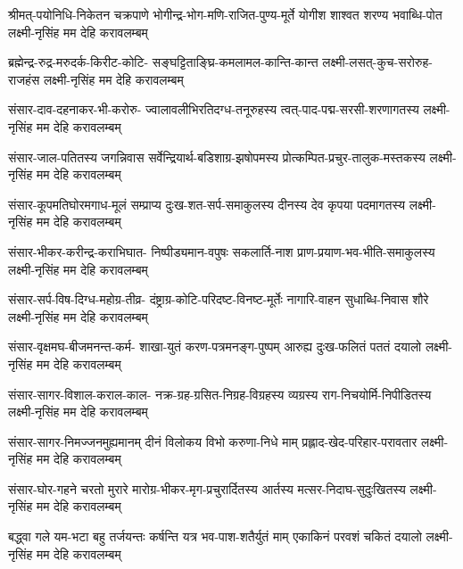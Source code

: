 


\fourlineindentedshloka
{श्रीमत्-पयोनिधि-निकेतन चक्रपाणे}
{भोगीन्द्र-भोग-मणि-राजित-पुण्य-मूर्ते}
{योगीश शाश्वत शरण्य भवाब्धि-पोत}
{लक्ष्मी-नृसिंह मम देहि करावलम्बम्}

\fourlineindentedshloka
{ब्रह्मेन्द्र-रुद्र-मरुदर्क-किरीट-कोटि-}
{सङ्घट्टिताङ्घ्रि-कमलामल-कान्ति-कान्त}
{लक्ष्मी-लसत्-कुच-सरोरुह-राजहंस}
{लक्ष्मी-नृसिंह मम देहि करावलम्बम्}

\fourlineindentedshloka
{संसार-दाव-दहनाकर-भी-करोरु-}
{ज्वालावलीभिरतिदग्ध-तनूरुहस्य}
{त्वत्-पाद-पद्म-सरसी-शरणागतस्य}
{लक्ष्मी-नृसिंह मम देहि करावलम्बम्}

\fourlineindentedshloka
{संसार-जाल-पतितस्य जगन्निवास}
{सर्वेन्द्रियार्थ-बडिशाग्र-झषोपमस्य}
{प्रोत्कम्पित-प्रचुर-तालुक-मस्तकस्य}
{लक्ष्मी-नृसिंह मम देहि करावलम्बम्}

\fourlineindentedshloka
{संसार-कूपमतिघोरमगाध-मूलं}
{सम्प्राप्य दुःख-शत-सर्प-समाकुलस्य}
{दीनस्य देव कृपया पदमागतस्य}
{लक्ष्मी-नृसिंह मम देहि करावलम्बम्}

\fourlineindentedshloka
{संसार-भीकर-करीन्द्र-कराभिघात-}
{निष्पीड्यमान-वपुषः सकलार्ति-नाश}
{प्राण-प्रयाण-भव-भीति-समाकुलस्य}
{लक्ष्मी-नृसिंह मम देहि करावलम्बम्}

\fourlineindentedshloka
{संसार-सर्प-विष-दिग्ध-महोग्र-तीव्र-}
{दंष्ट्राग्र-कोटि-परिदष्ट-विनष्ट-मूर्तेः}
{नागारि-वाहन सुधाब्धि-निवास शौरे}
{लक्ष्मी-नृसिंह मम देहि करावलम्बम्}

\fourlineindentedshloka
{संसार-वृक्षमघ-बीजमनन्त-कर्म-}
{शाखा-युतं करण-पत्रमनङ्ग-पुष्पम्}
{आरुह्य दुःख-फलितं पततं दयालो}
{लक्ष्मी-नृसिंह मम देहि करावलम्बम्}

\fourlineindentedshloka
{संसार-सागर-विशाल-कराल-काल-}
{नक्र-ग्रह-ग्रसित-निग्रह-विग्रहस्य}
{व्यग्रस्य राग-निचयोर्मि-निपीडितस्य}
{लक्ष्मी-नृसिंह मम देहि करावलम्बम्}

\fourlineindentedshloka
{संसार-सागर-निमज्जनमुह्यमानम्}
{दीनं विलोकय विभो करुणा-निधे माम्}
{प्रह्लाद-खेद-परिहार-परावतार}
{लक्ष्मी-नृसिंह मम देहि करावलम्बम्}

\fourlineindentedshloka
{संसार-घोर-गहने चरतो मुरारे}
{मारोग्र-भीकर-मृग-प्रचुरार्दितस्य}
{आर्तस्य मत्सर-निदाघ-सुदुःखितस्य}
{लक्ष्मी-नृसिंह मम देहि करावलम्बम्}

\fourlineindentedshloka
{बद्\mbox{}ध्वा गले यम-भटा बहु तर्जयन्तः}
{कर्षन्ति यत्र भव-पाश-शतैर्युतं माम्}
{एकाकिनं परवशं चकितं दयालो}
{लक्ष्मी-नृसिंह मम देहि करावलम्बम्}

